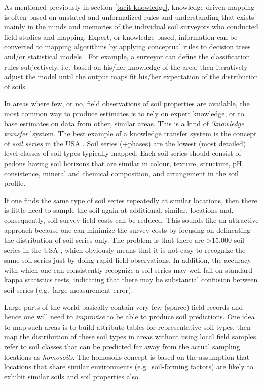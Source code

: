 \documentclass[11pt]{krantz}
\theoremstyle{definition}
\theoremstyle{definition}
\theoremstyle{definition}
\theoremstyle{remark}
\begin{document}
As mentioned previously in section \ref{tacit-knowledge},
knowledge-driven mapping is often based on unstated and unformalized
rules and understanding that exists mainly in the minds and memories of
the individual soil surveyors who conducted field studies and mapping.
Expert, or knowledge-based, information can be converted to mapping
algorithms by applying conceptual rules to decision trees and/or
statistical models \citep{MacMillan2005CJSS, Walter2006DSS, Liu2009}.
For example, a surveyor can define the classification rules
subjectively, i.e.~based on his/her knowledge of the area, then
iteratively adjust the model until the output maps fit his/her
expectation of the distribution of soils.

In areas where few, or no, field observations of soil properties are
available, the most common way to produce estimates is to rely on expert
knowledge, or to base estimates on data from other, similar areas. This
is a kind of \emph{`knowledge transfer'} system. The best example of a
knowledge transfer system is the concept of \emph{soil series} in the
USA \citep{Simonson1968AA}. Soil series (+phases) are the lowest (most
detailed) level classes of soil types typically mapped. Each soil series
should consist of pedons having soil horizons that are similar in
colour, texture, structure, pH, consistence, mineral and chemical
composition, and arrangement in the soil profile.

If one finds the same type of soil series repeatedly at similar
locations, then there is little need to sample the soil again at
additional, similar, locations and, consequently, soil survey field
costs can be reduced. This sounds like an attractive approach because
one can minimize the survey costs by focusing on delineating the
distribution of soil series only. The problem is that there are
\textgreater{}15,000 soil series in the USA \citep{Smith1986SMSS}, which
obviously means that it is not easy to recognize the same soil series
just by doing rapid field observations. In addition, the accuracy with
which one can consistently recognize a soil series may well fail on
standard kappa statistics tests, indicating that there may be
substantial confusion between soil series (e.g.~large measurement
error).

Large parts of the world basically contain very few (sparce) field
records and hence one will need to \emph{improvise} to be able to
produce soil predictions. One idea to map such areas is to build
attribute tables for representative soil types, then map the
distribution of these soil types in areas without using local field
samples. \citet{Mallavan2010PSS} refer to soil classes that can be
predicted far away from the actual sampling locations as
\emph{homosoils}. The homosoils concept is based on the assumption that
locations that share similar environments (e.g.~soil-forming factors)
are likely to exhibit similar soils and soil properties also.
\end{document}
